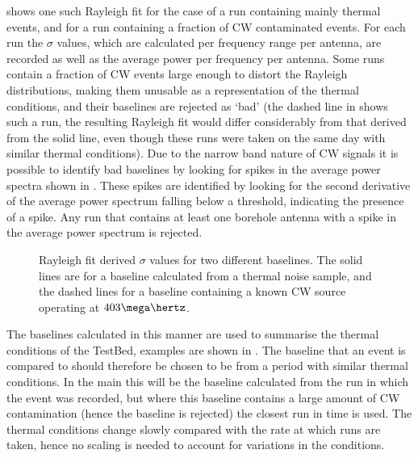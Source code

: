  shows one such Rayleigh fit for the case of a run containing mainly thermal events, and for a run containing a fraction of CW contaminated events. For each run the $\sigma$ values, which are calculated per frequency range per antenna, are recorded as well as the average power per frequency per antenna. Some runs contain a fraction of CW events large enough to distort the Rayleigh distributions, making them unusable as a representation of the thermal conditions, and their baselines are rejected as `bad' (the dashed line in  shows such a run, the resulting Rayleigh fit would differ considerably from that derived from the solid line, even though these runs were taken on the same day with similar thermal conditions). Due to the narrow band nature of CW signals it is possible to identify bad baselines by looking for spikes in the average power spectra shown in . These spikes are identified by looking for the second derivative of the average power spectrum falling below a threshold, indicating the presence of a spike. Any run that contains at least one borehole antenna with a spike in the average power spectrum is rejected. 

\begin{figure}[htpb]
  \hfill
  \caption{Rayleigh fit derived $\sigma$ values for two different baselines. The solid lines are for a baseline calculated from a thermal noise sample, and the dashed lines for a baseline containing a known CW source operating at $403 \mega \hertz$.} 
  \label{fig:analysis:CWRemoval:Baselines:Rayleigh-Sigma}
\end{figure}

The baselines calculated in this manner are used to summarise the thermal conditions of the TestBed, examples are shown in . The baseline that an event is compared to should therefore be chosen to be from a period with similar thermal conditions. In the main this will be the baseline calculated from the run in which the event was recorded, but where this baseline contains a large amount of CW contamination (hence the baseline is rejected) the closest run in time is used. The thermal conditions change slowly compared with the rate at which runs are taken, hence no scaling is needed to account for variations in the conditions.

